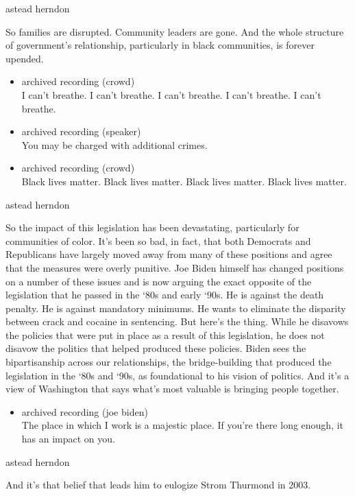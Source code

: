 astead herndon

So families are disrupted. Community leaders are gone. And the whole
structure of government's relationship, particularly in black
communities, is forever upended.

\begin{itemize}
\item
  archived recording (crowd)\\
  I can't breathe. I can't breathe. I can't breathe. I can't breathe. I
  can't breathe.
\item
  archived recording (speaker)\\
  You may be charged with additional crimes.
\item
  archived recording (crowd)\\
  Black lives matter. Black lives matter. Black lives matter. Black
  lives matter.
\end{itemize}

astead herndon

So the impact of this legislation has been devastating, particularly for
communities of color. It's been so bad, in fact, that both Democrats and
Republicans have largely moved away from many of these positions and
agree that the measures were overly punitive. Joe Biden himself has
changed positions on a number of these issues and is now arguing the
exact opposite of the legislation that he passed in the `80s and early
`90s. He is against the death penalty. He is against mandatory minimums.
He wants to eliminate the disparity between crack and cocaine in
sentencing. But here's the thing. While he disavows the policies that
were put in place as a result of this legislation, he does not disavow
the politics that helped produced these policies. Biden sees the
bipartisanship across our relationships, the bridge-building that
produced the legislation in the `80s and `90s, as foundational to his
vision of politics. And it's a view of Washington that says what's most
valuable is bringing people together.

\begin{itemize}
\tightlist
\item
  archived recording (joe biden)\\
  The place in which I work is a majestic place. If you're there long
  enough, it has an impact on you.
\end{itemize}

astead herndon

And it's that belief that leads him to eulogize Strom Thurmond in 2003.

